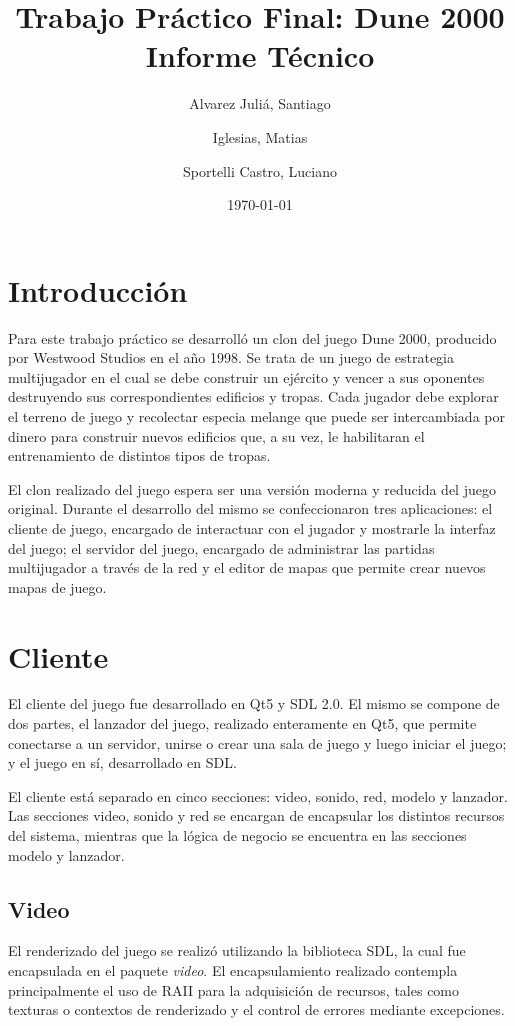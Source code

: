 \documentclass[titlepage,a4paper,12pt]{article}
\title{ Trabajo Práctico Final: Dune 2000 \\ 
 \large{Informe Técnico}}
\author{Alvarez Juliá, Santiago \and Iglesias, Matias \and Sportelli Castro, Luciano}
\date{ \today }
\begin{document}
\maketitle

\tableofcontents %

\newpage
\section{Introducción}
Para este trabajo práctico se desarrolló un clon del juego Dune 2000, producido por Westwood Studios en el año 1998. Se trata de un juego de estrategia multijugador en el cual se debe construir un ejército y vencer a sus oponentes destruyendo sus correspondientes edificios y tropas.
Cada jugador debe explorar el terreno de juego y recolectar especia melange que puede ser intercambiada por dinero para construir nuevos edificios que, a su vez, le habilitaran el entrenamiento de distintos tipos de tropas.

El clon realizado del juego espera ser una versión moderna y reducida del juego original. Durante el desarrollo del mismo se confeccionaron tres aplicaciones: el cliente de juego, encargado de interactuar con el jugador y mostrarle la interfaz del juego; el servidor del juego, encargado de administrar las partidas multijugador a través de la red y el editor de mapas que permite crear nuevos mapas de juego.

\section{Cliente}
El cliente del juego fue desarrollado en Qt5 y SDL 2.0. El mismo se compone de dos partes, el lanzador del juego, realizado enteramente en Qt5, que permite conectarse a un servidor, unirse o crear una sala de juego y luego iniciar el juego; y el juego en sí, desarrollado en SDL.

El cliente está separado en cinco secciones: video, sonido, red, modelo y lanzador. Las secciones video, sonido y red se encargan de encapsular los distintos recursos del sistema, mientras que la lógica de negocio se encuentra en las secciones modelo y lanzador.

\subsection{Video}
El renderizado del juego se realizó utilizando la biblioteca SDL, la cual fue encapsulada en el paquete \textit{video}. El encapsulamiento realizado contempla principalmente el uso de RAII para la adquisición de recursos, tales como texturas o contextos de renderizado y el control de errores mediante excepciones.
\end{document}
